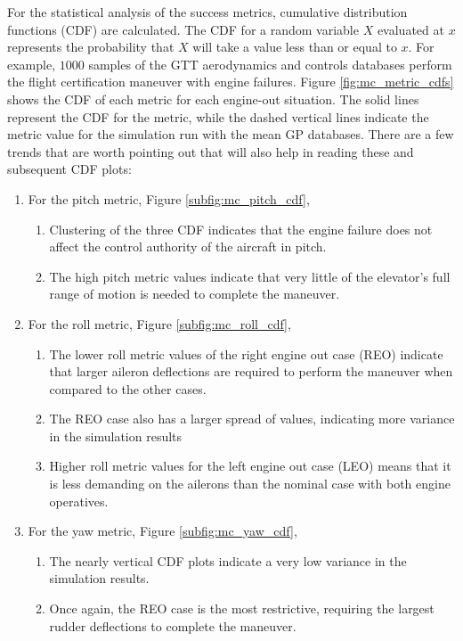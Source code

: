 For the statistical analysis of the success metrics, cumulative distribution functions (CDF) are calculated.
The CDF for a random variable $X$ evaluated at $x$ represents the probability that $X$ will take a value less than or equal to $x$.
For example, $1000$ samples of the GTT aerodynamics and controls databases perform the flight certification maneuver with engine failures. 
Figure \ref{fig:mc_metric_cdfs} shows the CDF of each metric for each engine-out situation.
The solid lines represent the CDF for the metric, while the dashed vertical lines indicate the metric value for the simulation run with the mean GP databases.
There are a few trends that are worth pointing out that will also help in reading these and subsequent CDF plots:

\begin{enumerate}
    \item For the pitch metric, Figure \ref{subfig:mc_pitch_cdf},
    \begin{enumerate}
        \item Clustering of the three CDF indicates that the engine failure does not affect the control authority of the aircraft in pitch.
        \item The high pitch metric values indicate that very little of the elevator's full range of motion is needed to complete the maneuver.
    \end{enumerate}
    \item For the roll metric, Figure \ref{subfig:mc_roll_cdf},
    \begin{enumerate}
        \item The lower roll metric values of the right engine out case (REO) indicate that larger aileron deflections are required to perform the maneuver when compared to the other cases.
        \item The REO case also has a larger spread of values, indicating more variance in the simulation results
        \item Higher roll metric values for the left engine out case (LEO) means that it is less demanding on the ailerons than the nominal case with both engine operatives. 
    \end{enumerate}
    \item For the yaw metric, Figure \ref{subfig:mc_yaw_cdf},
    \begin{enumerate}
        \item The nearly vertical CDF plots indicate a very low variance in the simulation results.
        \item Once again, the REO case is the most restrictive, requiring the largest rudder deflections to complete the maneuver. 
    \end{enumerate}
\end{enumerate}

